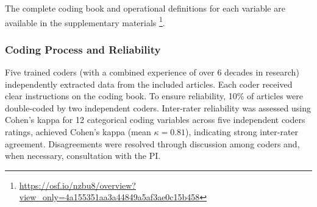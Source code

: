 \documentclass[manuscript,anonymous,sigconf]{acmart}
\begin{document}

The complete coding book and operational definitions for each variable are available in the supplementary materials \footnote{\href{https://osf.io/nzbu8/overview?view_only=4a155351aa3a44849a5af3ae0c15b458}{https://osf.io/nzbu8/overview?view\_only=4a155351aa3a44849a5af3ae0c15b458}}.

\subsubsection{Coding Process and Reliability}

Five trained coders (with a combined experience of over 6 decades in research) independently extracted data from the included articles. Each coder received clear instructions on the coding book. To ensure reliability, 10\% of articles were double-coded by two independent coders. Inter-rater reliability was assessed using Cohen's kappa for 12 categorical coding variables across five independent coders ratings, achieved Cohen's kappa (mean $\kappa = 0.81$), indicating strong inter-rater agreement. Disagreements were resolved through discussion among coders and, when necessary, consultation with the PI. 
\end{document}
